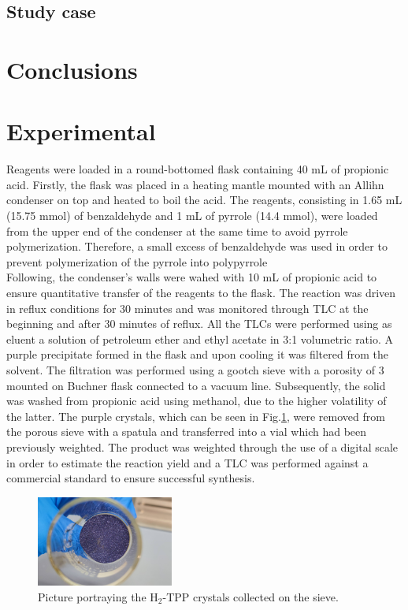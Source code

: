\documentclass[num-refs]{wiley-article}
\begin{document}
\subsection{Study case}

\section{Conclusions}

\section{Experimental}
Reagents were loaded in a round-bottomed flask containing 40 mL of propionic acid.
Firstly, the flask was placed in a heating mantle mounted with an Allihn condenser on top and heated to boil the acid.
The reagents, consisting in 1.65 mL (15.75 mmol) of benzaldehyde and 1 mL of pyrrole (14.4 mmol), were loaded from the upper end of the condenser at the same time to avoid pyrrole polymerization.
Therefore, a small excess of benzaldehyde was used in order to prevent polymerization of the pyrrole into polypyrrole \\
Following, the condenser's walls were wahed with 10 mL of propionic acid to ensure quantitative transfer of the reagents to the flask.
The reaction was driven in reflux conditions for 30 minutes and was monitored through TLC at the beginning and after 30 minutes of reflux.
All the TLCs were performed using as eluent a solution of petroleum ether and ethyl acetate in 3:1 volumetric ratio.
A purple precipitate formed in the flask and upon cooling it was filtered from the solvent.
The filtration was performed using a gootch sieve with a porosity of 3 mounted on Buchner flask connected to a vacuum line.
Subsequently, the solid was washed from propionic acid using methanol, due to the higher volatility of the latter.
The purple crystals, which can be seen in Fig.\ref{pic-tpp}, were removed from the porous sieve with a spatula and transferred into a vial which had been previously weighted.
The product was weighted through the use of a digital scale in order to estimate the reaction yield and a TLC was performed against a commercial standard to ensure successful synthesis.\\
\begin{figure}[h]
    \centering
    \includegraphics[width=0.4\textwidth]{photo-tpp}
    \caption{Picture portraying the H$_{2}$-TPP crystals collected on the sieve.}
    \label{pic-tpp}
\end{figure}
\end{document}
